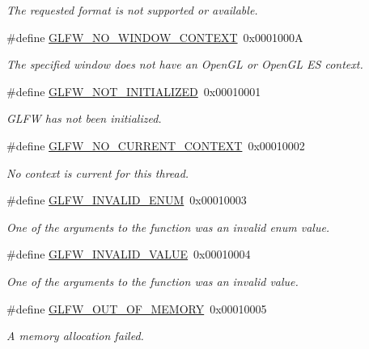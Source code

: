 \begin{DoxyCompactItemize}
\begin{DoxyCompactList}\small\item\em The requested format is not supported or available. \end{DoxyCompactList}\item 
\#define \hyperlink{group__errors_gacff24d2757da752ae4c80bf452356487}{G\+L\+F\+W\+\_\+\+N\+O\+\_\+\+W\+I\+N\+D\+O\+W\+\_\+\+C\+O\+N\+T\+E\+XT}~0x0001000A
\begin{DoxyCompactList}\small\item\em The specified window does not have an Open\+GL or Open\+GL ES context. \end{DoxyCompactList}\item 
\#define \hyperlink{group__errors_ga2374ee02c177f12e1fa76ff3ed15e14a}{G\+L\+F\+W\+\_\+\+N\+O\+T\+\_\+\+I\+N\+I\+T\+I\+A\+L\+I\+Z\+ED}~0x00010001
\begin{DoxyCompactList}\small\item\em G\+L\+FW has not been initialized. \end{DoxyCompactList}\item 
\#define \hyperlink{group__errors_gaa8290386e9528ccb9e42a3a4e16fc0d0}{G\+L\+F\+W\+\_\+\+N\+O\+\_\+\+C\+U\+R\+R\+E\+N\+T\+\_\+\+C\+O\+N\+T\+E\+XT}~0x00010002
\begin{DoxyCompactList}\small\item\em No context is current for this thread. \end{DoxyCompactList}\item 
\#define \hyperlink{group__errors_ga76f6bb9c4eea73db675f096b404593ce}{G\+L\+F\+W\+\_\+\+I\+N\+V\+A\+L\+I\+D\+\_\+\+E\+N\+UM}~0x00010003
\begin{DoxyCompactList}\small\item\em One of the arguments to the function was an invalid enum value. \end{DoxyCompactList}\item 
\#define \hyperlink{group__errors_gaaf2ef9aa8202c2b82ac2d921e554c687}{G\+L\+F\+W\+\_\+\+I\+N\+V\+A\+L\+I\+D\+\_\+\+V\+A\+L\+UE}~0x00010004
\begin{DoxyCompactList}\small\item\em One of the arguments to the function was an invalid value. \end{DoxyCompactList}\item 
\#define \hyperlink{group__errors_ga9023953a2bcb98c2906afd071d21ee7f}{G\+L\+F\+W\+\_\+\+O\+U\+T\+\_\+\+O\+F\+\_\+\+M\+E\+M\+O\+RY}~0x00010005
\begin{DoxyCompactList}\small\item\em A memory allocation failed. \end{DoxyCompactList}\item 

\end{DoxyCompactItemize}
